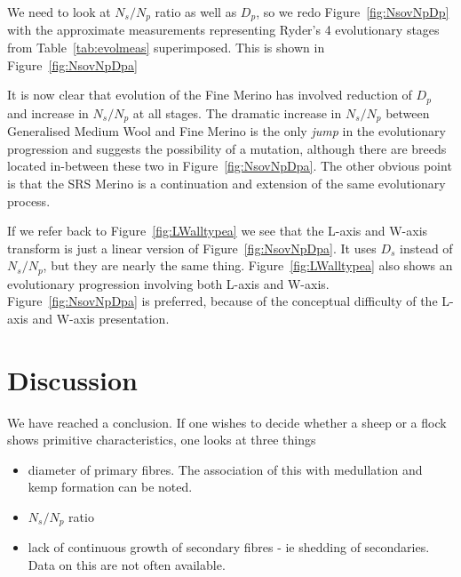 \documentclass[titlepage]{article}  %
\begin{document}
We need to look at $N_{s}/N_{p}$ ratio as well as $D_{p}$, so we redo Figure~\ref{fig:NsovNpDp} with the approximate measurements representing Ryder's 4 evolutionary stages from Table~\ref{tab:evolmeas} superimposed. This is shown in Figure~\ref{fig:NsovNpDpa}

It is now clear that evolution of the Fine Merino has involved reduction of $D_{p}$ and increase in $N_{s}/N_{p}$ at all stages. The dramatic increase in $N_{s}/N_{p}$ between Generalised Medium Wool and Fine Merino is the only {\em jump} in the evolutionary progression and suggests the possibility of a mutation, although there are breeds located in-between these two in Figure~\ref{fig:NsovNpDpa}. The other obvious point is that the SRS Merino is a continuation and extension of the same evolutionary process. 

If we refer back to Figure~\ref{fig:LWalltypea} we see that the L-axis and W-axis transform is just a linear version of Figure~\ref{fig:NsovNpDpa}. It uses $D_{s}$ instead of $N_{s}/N_{p}$, but they are nearly the same thing. Figure~\ref{fig:LWalltypea} also shows an evolutionary progression involving both L-axis and W-axis. Figure~\ref{fig:NsovNpDpa} is preferred, because of the conceptual difficulty of the L-axis and W-axis presentation.


\clearpage
\section{Discussion}
 We have reached a conclusion. If one wishes to decide whether a sheep or a flock shows primitive characteristics, one looks at three things
\begin{itemize}
\item diameter of primary fibres. The association of this with medullation and kemp formation can be noted.
\item $N_{s}/N_{p}$ ratio
\item lack of continuous growth of secondary fibres - ie shedding of secondaries.  Data on this are not often available.
\end{itemize}
\end{document}
